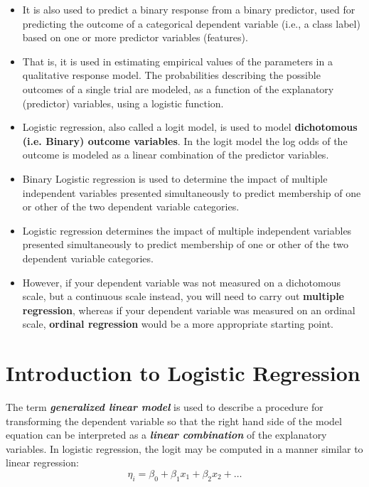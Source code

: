 \documentclass[a4paper,12pt]{article}
\begin{document}
{\begin{itemize}
	\item It is also used to predict a binary response from a binary predictor, used for predicting the outcome of a categorical dependent variable (i.e., a class label) based on one or more predictor variables (features). 
	
	\item That is, it is used in estimating empirical values of the parameters in a qualitative response model. The probabilities describing the possible outcomes of a single trial are modeled, as a function of the explanatory (predictor) variables, using a logistic function. 
	
	\item Logistic regression, also called a logit model, is used to model \textbf{dichotomous (i.e. Binary) outcome variables}. In the logit model the log odds of the outcome is modeled as a linear combination of the predictor variables.
	
	\item 
	Binary Logistic regression is used to determine the impact of multiple independent variables
	presented simultaneously to predict membership of one or other of the two
	dependent variable categories.
	\item Logistic regression determines the impact of multiple independent variables
	presented simultaneously to predict membership of one or other of the two
	dependent variable categories.
	\item However, if your dependent variable was not measured on a dichotomous scale, but a continuous scale instead, you will need to carry out \textbf{multiple regression}, whereas if your dependent variable was measured on an ordinal scale, \textbf{ordinal regression} would be a more appropriate starting point.
\end{itemize}



\section*{Introduction to Logistic Regression}

The term \textbf{\textit{generalized linear model}} is used to describe a procedure for
transforming the dependent variable so that the right hand side of the model
equation can be interpreted as a \textbf{\textit{linear combination}} of the explanatory variables. 	In logistic regression, the logit may be computed in a manner similar to linear regression:
\[ \eta_i = \beta_0 + \beta_1x_1 + \beta_2x_2 + \ldots  \]

}
\end{document}
